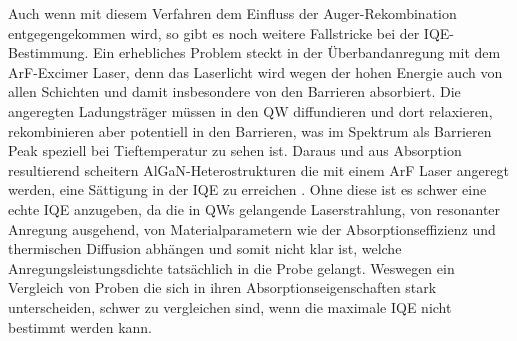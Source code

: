 Auch wenn mit diesem Verfahren dem Einfluss der Auger-Rekombination entgegengekommen wird, so gibt es noch weitere Fallstricke bei der IQE-Bestimmung. Ein erhebliches Problem steckt in der Überbandanregung mit dem ArF-Excimer Laser, denn das Laserlicht wird wegen der hohen Energie auch von allen Schichten und damit insbesondere von den Barrieren absorbiert. Die angeregten Ladungsträger müssen in den QW diffundieren und dort relaxieren, rekombinieren aber potentiell in den Barrieren, was im Spektrum als Barrieren Peak speziell bei Tieftemperatur zu sehen ist.
Daraus und aus Absorption resultierend scheitern AlGaN-Heterostrukturen die mit einem ArF Laser angeregt werden, eine Sättigung in der IQE zu erreichen \cite{doi:10.1063/1.4965298} \cite{doi:10.1063/1.5044383}. Ohne diese ist es schwer eine echte IQE anzugeben, da die in QWs gelangende Laserstrahlung, von resonanter Anregung ausgehend, von Materialparametern wie der Absorptionseffizienz und thermischen Diffusion abhängen und somit nicht klar ist, welche Anregungsleistungsdichte tatsächlich in die Probe gelangt. Weswegen ein Vergleich von Proben die sich in ihren Absorptionseigenschaften stark unterscheiden, schwer zu vergleichen sind, wenn die maximale IQE nicht bestimmt werden kann. 


